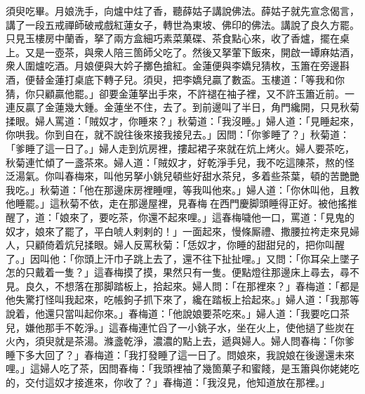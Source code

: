 須臾吃畢。月娘洗手，向爐中炷了香，聽薛姑子講說佛法。薛姑子就先宣念偈言，講了一段五戒禪師破戒戲紅蓮女子，轉世為東坡、佛印的佛法。講說了良久方罷。只見玉樓房中蘭香，拏了兩方盒細巧素菜菓碟、茶食點心來，收了香爐，擺在桌上。又是一壺茶，與衆人陪三箇師父吃了。然後又拏葷下飯來，開啟一罈麻姑酒，衆人圍爐吃酒。月娘便與大妗子擲色搶紅。金蓮便與李嬌兒猜枚，玉簫在旁邊斟酒，便替金蓮打桌底下轉子兒。須臾，把李嬌兒贏了數盃。{}玉樓道：「等我和你猜，你只顧贏他罷。」卻要金蓮拏出手來，不許褪在袖子裡，又不許玉簫近前。{}一連反贏了金蓮幾大鍾。金蓮坐不住，去了。到前邊叫了半日，角門纔開，只見秋菊揉眼。婦人罵道：「賊奴才，你睡來？」秋菊道：「我沒睡。」{}婦人道：「見睡起來，你哄我。你到自在，就不說往後來接我接兒去。」因問：「你爹睡了？」秋菊道：「爹睡了這一日了。」婦人走到炕房裡，摟起裙子來就在炕上烤火。婦人要茶吃，秋菊連忙傾了一盞茶來。婦人道：「賊奴才，好乾淨手兒，我不吃這陳茶，熬的怪泛湯氣。你叫春梅來，叫他另拏小銚兒頓些好甜水茶兒，多着些茶葉，頓的苦艷艷我吃。」秋菊道：「他在那邊床房裡睡哩，等我叫他來。」婦人道：「你休叫他，且教他睡罷。」{}這秋菊不依，走在那邊屋裡，見春梅𢱉在西門慶脚頭睡得正好。{}被他搖推醒了，道：「娘來了，要吃茶，你還不起來哩。」這春梅噦他一口，罵道：「見鬼的奴才，娘來了罷了，平白唬人剌剌的！」一面起來，慢條厮禮、撒腰拉袴走來見婦人，只顧倚着炕兒揉眼。婦人反罵秋菊：「恁奴才，你睡的甜甜兒的，把你叫醒了。」因叫他：「你頭上汗巾子跳上去了，還不往下扯扯哩。」又問：「你耳朵上墜子怎的只戴着一隻？」這春梅摸了摸，果然只有一隻。便點燈往那邊床上尋去，尋不見。良久，不想落在那脚踏板上，拾起來。婦人問：「在那裡來？」春梅道：「都是他失驚打怪叫我起來，吃帳鉤子抓下來了，纔在踏板上拾起來。」{}婦人道：「我那等說着，他還只當叫起你來。」春梅道：「他說娘要茶吃來。」婦人道：「我要吃口茶兒，嫌他那手不乾淨。」這春梅連忙舀了一小銚子水，坐在火上，使他撾了些炭在火內，須臾就是茶湯。滌盞乾淨，濃濃的點上去，遞與婦人。婦人問春梅：「你爹睡下多大回了？」春梅道：「我打發睡了這一日了。問娘來，我說娘在後邊還未來哩。」這婦人吃了茶，因問春梅：「我頭裡袖了幾箇菓子和蜜餞，是玉簫與你姥姥吃的，交付這奴才接進來，你收了？」春梅道：「我沒見，他知道放在那裡。」

